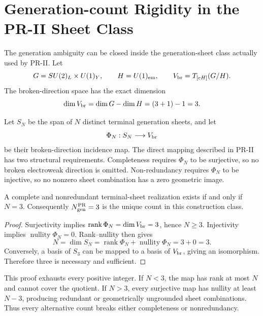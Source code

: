 \section{Generation-count Rigidity in the PR-II Sheet Class}
\label{app:generation-count-rigidity}

The generation ambiguity can be closed inside the generation-sheet class actually used by PR-II.  Let
\begin{equation}
 G=SU(2)_L\times U(1)_Y,
 \qquad H=U(1)_{\rm em},
 \qquad V_{\rm br}=T_{[eH]}(G/H).
\end{equation}
The broken-direction space has the exact dimension
\begin{equation}
 \dim V_{\rm br}=\dim G-\dim H=(3+1)-1=3.
 \label{eq:pr35-broken-dimension}
\end{equation}

Let $S_N$ be the span of $N$ distinct terminal generation sheets, and let
\begin{equation}
 \Phi_N:S_N\longrightarrow V_{\rm br}
 \label{eq:pr35-sheet-incidence-map}
\end{equation}
be their broken-direction incidence map.  The direct mapping described in PR-II has two structural requirements.  Completeness requires $\Phi_N$ to be surjective, so no broken electroweak direction is omitted.  Non-redundancy requires $\Phi_N$ to be injective, so no nonzero sheet combination has a zero
geometric image.

\begin{theorem}
A complete and nonredundant terminal-sheet realization exists if and only if $N=3$.  Consequently $N_{\rm gen}^{\rm PR}=3$ is the unique count in this construction class.
\end{theorem}

\begin{proof}
Surjectivity implies $\operatorname{rank}\Phi_N=\dim V_{\rm br}=3$, hence $N\ge3$.  Injectivity implies $\operatorname{nullity}\Phi_N=0$.  Rank--nullity then gives
\begin{equation}
 N=\dim S_N
 =\operatorname{rank}\Phi_N+\operatorname{nullity}\Phi_N
 =3+0=3.
\end{equation}
Conversely, a basis of $S_3$ can be mapped to a basis of $V_{\rm br}$, giving an isomorphism.  Therefore three is necessary and sufficient.
\end{proof}

This proof exhausts every positive integer.  If $N<3$, the map has rank at most $N$ and cannot cover the quotient.  If $N>3$, every surjective map has nullity at least $N-3$, producing redundant or geometrically ungrounded sheet combinations.  Thus every alternative count breaks either completeness or nonredundancy.

